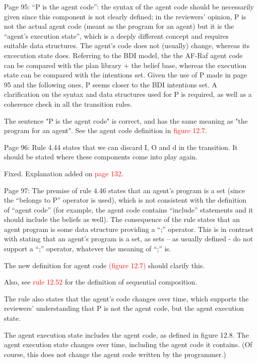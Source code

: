 \documentclass{article}
\newcommand*\R[1]{\textcolor{red}{#1}} %
\newenvironment{them}{\noindent\begingroup\color{blue}}{\endgroup\par}
\begin{document}
\begin{them}

Page 95:
“P is the agent code”: the syntax of the agent code should be necessarily given
since this component is not clearly defined; in the reviewers' opinion, P is
not the actual agent code (meant as the program for an agent) but it is the
“agent's execution state”, which is a deeply different concept and requires
suitable data structures. The agent's code does not (usually) change, whereas
its excecution state does. Referring to the BDI model, the the AF-Raf agent
code can be compared with the plan library + the belief base, whereas the
execution state can be compared with the intentions set. Given the use of P
made in page 95 and the following ones, P seems closer to the BDI intentions
set. A clarification on the syntax and data structures used for P is required,
as well as a coherence check in all the transition rules.

\end{them}
The sentence "P is the agent code" is correct, and has the same meaning as "the
program for an agent". See the agent code definition in \R{figure 12.7}. 

\begin{them}

Page 96:
Rule 4.44 states that we can discard I, O and d in the transition. It should be
stated where these components come into play again.

\end{them}
Fixed. Explanation added on \R{page 132}.

\begin{them}

Page 97:
The premise of rule 4.46 states that an agent's program is a set (since the
“belongs to P” operator is used), which is not consistent with the definition
of “agent code” (for example, the agent code contains “include” statements and
it should include the beliefs as well). The consequence of the rule states that
an agent program is some data structure providing a “;” operator. This is in
contrast with stating that an agent's program is a set, as sets – as usually
defined - do not support a “;” operator, whatever the meaning of “;” is.

\end{them}
The new definition for agent code \R{(figure 12.7)} should clarify this.

Also, see \R{rule 12.52} for the definition of sequential composition.


\begin{them}

The rule also states that the agent's code changes over time, which supports
the reviewers' understanding that P is not the agent code, but the agent
execution state.

\end{them}
The agent execution state includes the agent code, as defined in figure 12.8. The agent execution state changes over time,
  including the agent code it contains.
(Of course, this does not change the agent code written by the programmer.)
\end{document}
